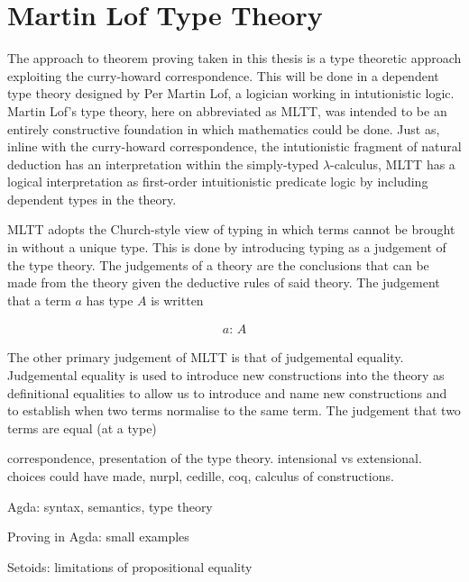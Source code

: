 \section{Martin Lof Type Theory}
The approach to theorem proving taken in this thesis is a type theoretic
approach exploiting the curry-howard correspondence. This will be done in a
dependent type theory designed by Per Martin Lof, a logician working in
intutionistic logic. Martin Lof's type theory, here on abbreviated as MLTT, was
intended to be an entirely constructive foundation in which mathematics could be
done. Just as, inline with the curry-howard correspondence, the intutionistic
fragment of natural deduction has an interpretation within the simply-typed
$\lambda$-calculus, MLTT has a logical interpretation as first-order
intuitionistic predicate logic by including dependent types in the theory.

MLTT adopts the Church-style view of typing in which terms cannot be brought in
without a unique type. This is done by introducing typing as a judgement of the
type theory. The judgements of a theory are the conclusions that can be made
from the theory given the deductive rules of said theory. The judgement that a
term $a$ has type $A$ is written

\begin{align*}
    a: \, A
\end{align*}

The other primary judgement of MLTT is that of judgemental equality. Judgemental
equality is used to introduce new constructions into the theory as definitional
equalities to allow us to introduce and name new constructions and to establish
when two terms normalise to the same term. The judgement that two terms are
equal (at a type) 


correspondence, presentation of the type theory. intensional vs extensional.
choices could have made, nurpl, cedille, coq, calculus of constructions.

Agda: syntax, semantics, type theory

Proving in Agda: small examples

Setoids: limitations of propositional equality
